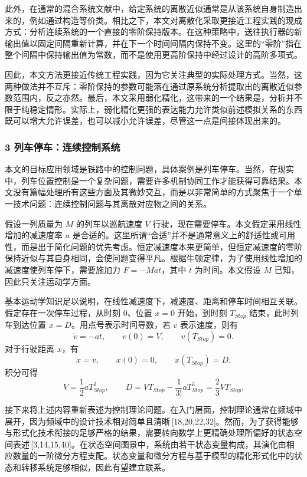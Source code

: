 {\indent 此外，在通常的混合系统文献中，给定系统的离散近似通常是从该系统自身制造出来的，例如通过构造等价类。相比之下，本文对离散化采取更接近工程实践的现成方式：分析连续系统的一个直接的零阶保持版本。在这种策略中，送往执行器的新输出值以固定间隔重新计算，并在下一个时间间隔内保持不变。这里的“零阶”指在整个间隔中保持输出值为常数，而不是使用更高阶保持中经过设计的高阶多项式。

\indent 因此，本文方法更接近传统工程实践，因为它关注典型的实际处理方式。当然，这两种做法并不互斥：零阶保持的参数可能落在通过原系统分析提取出的离散近似参数范围内，反之亦然。最后，本文采用弱化精化，这带来的一个结果是，分析并不限于纯稳定情形。实际上，弱化精化更强的表达能力允许类似前述模拟关系的东西既可以增大允许误差，也可以减小允许误差，尽管这一点是间接体现出来的。

\subsubsection*{3 列车停车：连续控制系统}

\indent 本文的目标应用领域是铁路中的控制问题，具体案例是列车停车。当然，在现实中，列车位置控制是一个复杂问题，需要许多机制协同工作才能获得可靠结果。本文没有篇幅处理所有这些方面及其微妙交互，而是以非常简单的方式聚焦于一个单一技术问题：连续控制问题与其离散对应物之间的关系。

\indent 假设一列质量为 $M$ 的列车以巡航速度 $V$ 行驶，现在需要停车。本文假定采用线性增加的减速度率 $a$ 是合适的。这里所谓“合适”并不是通常意义上的舒适性或可用性，而是出于简化问题的优先考虑。恒定减速度本来更简单，但恒定减速度的零阶保持近似与其自身相同，会使问题变得平凡。根据牛顿定律，为了使用线性增加的减速度使列车停下，需要施加力 $F=-Mat$，其中 $t$ 为时间。本文假设 $M$ 已知，因此只关注运动学方面。

\indent 基本运动学知识足以说明，在线性减速度下，减速度、距离和停车时间相互关联。假定存在一次停车过程，从时刻 $0$、位置 $x=0$ 开始，到时刻 $T_{Stop}$ 结束，此时列车到达位置 $x=D$。用点号表示时间导数，若 $v$ 表示速度，则有
\[
\dot{v}=-at,\qquad v(0)=V,\qquad v(T_{Stop})=0 .
\]
对于行驶距离 $x$，有
\[
\dot{x}=v,\qquad x(0)=0,\qquad x(T_{Stop})=D .
\]
积分可得
\[
V=\frac{1}{2}aT_{Stop}^{2},\qquad
D=VT_{Stop}-\frac{1}{3!}aT_{Stop}^{3}
=\frac{2}{3}VT_{Stop}.
\]

\indent 接下来将上述内容重新表述为控制理论问题。在入门层面，控制理论通常在频域中展开，因为频域中的设计技术相对简单且清晰\,[18,20,22,32]。然而，为了获得能够与形式化技术衔接的足够严格的结果，需要转向数学上更精确处理所偏好的状态空间表述\,[3,14,15,40]。在状态空间图景中，系统由若干状态变量构成，其演化由相应数量的一阶微分方程支配。状态变量和微分方程与基于模型的精化形式化中的状态和转移系统足够相似，因此有望建立联系。

}
